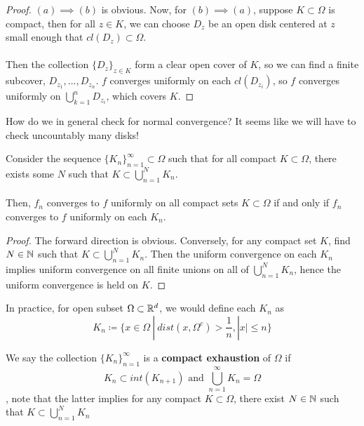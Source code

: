 \documentclass{article}
\begin{document}
\begin{proof}
$(a) \implies (b)$ is obvious. Now, for $(b) \implies (a)$, suppose $K \subset \Omega$ is compact, then for all $z \in K$, we can choose $D_z$ be an open disk centered at $z$ small enough that $cl(D_z) \subset \Omega$.\\\\
Then the collection $\{D_z\}_{z \in K}$ form a clear open cover of $K$, so we can find a finite subcover, $D_{z_1}, ..., D_{z_n}$. $f$ converges uniformly on each $cl(D_{z_i})$, so $f$ converges uniformly on $\bigcup_{k = 1}^n D_{z_i}$, which covers $K$.
\end{proof}

How do we in general check for normal convergence? It seems like we will have to check uncountably many disks!

\begin{proposition}
Consider the sequence $\{K_n\}_{n = 1}^\infty \subset \Omega$ such that for all compact $K \subset \Omega$, there exists some $N$ such that $K \subset \bigcup_{n = 1}^N K_n$.\\\\
Then, $f_n$ converges to $f$ uniformly on all compact sets $K \subset \Omega$ if and only if $f_n$ converges to $f$ uniformly on each $K_n$.
\end{proposition}

\begin{proof}
The forward direction is obvious. Conversely, for any compact set $K$, find $N \in \mathbb{N}$ such that $K \subset \bigcup_{n = 1}^N K_n$. Then the uniform convergence on each $K_n$ implies uniform convergence on all finite unions on all of $\bigcup_{n = 1}^N K_n$, hence the uniform convergence is held on $K$.
\end{proof}

\begin{remark}
In practice, for open subset $\Omega \subset \mathbb{R}^d$, we would define each $K_n$ as
\[K_n \coloneqq \{x \in \Omega\ |\ dist(x, \Omega^c) > \frac{1}{n}, |x| \leq n\}\]
\end{remark}

\begin{definition}
We say the collection $\{K_n\}_{n = 1}^\infty$ is a \textbf{compact exhaustion} of $\Omega$ if
\[K_n \subset int(K_{n+1}) \text{ and } \bigcup_{n = 1}^\infty K_n = \Omega\]
, note that the latter implies for any compact $K \subset \Omega$, there exist $N \in \mathbb{N}$ such that $K \subset \bigcup_{n = 1}^N K_n$
\end{definition}
\end{document}
